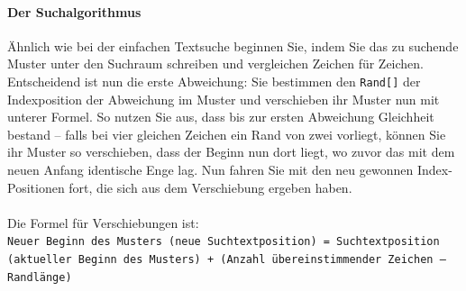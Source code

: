 \documentclass[11pt,a4paper]{scrartcl}
\begin{document}
\paragraph{Der Suchalgorithmus}
Ähnlich wie bei der einfachen Textsuche beginnen Sie, indem Sie das zu suchende Muster unter den Suchraum schreiben und vergleichen Zeichen für Zeichen. Entscheidend ist nun die erste Abweichung: Sie bestimmen den \texttt{Rand[]} der Indexposition der Abweichung im Muster und verschieben ihr Muster nun mit unterer Formel. So nutzen Sie aus, dass bis zur ersten Abweichung Gleichheit bestand -- falls bei vier gleichen Zeichen ein Rand von zwei vorliegt, können Sie ihr Muster so verschieben, dass der Beginn nun dort liegt, wo zuvor das mit dem neuen Anfang identische Enge lag. Nun fahren Sie mit den neu gewonnen Index-Positionen fort, die sich aus dem Verschiebung ergeben haben. \\\\
Die Formel für Verschiebungen ist: \\
\texttt{Neuer Beginn des Musters (neue Suchtextposition) = Suchtextposition (aktueller Beginn des Musters) + (Anzahl übereinstimmender Zeichen -- Randlänge)}
\end{document}
